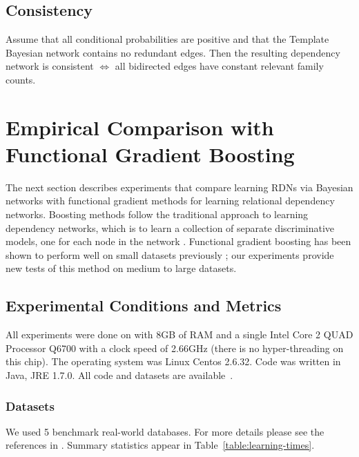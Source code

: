 \documentclass[runningheads,a4paper]{llncs}
\begin{document}
\subsection{Consistency}

\begin{theorem}
Assume that all conditional probabilities are positive and that the Template Bayesian network contains no redundant edges. Then the resulting dependency network is consistent $\iff$ all bidirected edges have constant relevant family counts.
\end{theorem}

\section{Empirical Comparison with Functional Gradient Boosting}\label{sec:empirical-comparison}

The next section describes experiments that compare learning RDNs via Bayesian networks with functional gradient methods for learning relational dependency networks. Boosting methods follow the traditional approach to learning dependency networks, which is to learn a collection of separate discriminative models, one for each node in the network \cite{Heckerman2000}. Functional gradient boosting has been shown to perform well on small datasets previously \cite{Khot2011,Natarajan2012}; our experiments provide new tests of this method on medium to large datasets. 
\subsection{Experimental Conditions and Metrics}\label{sec:conditions}
All experiments were done on with 8GB of RAM and a single Intel Core 2 QUAD Processor Q6700 with a clock speed of 2.66GHz (there is no hyper-threading on this chip). The operating system was Linux Centos 2.6.32. Code was written in Java, JRE 1.7.0. All code and datasets are available~\cite{bib:jbnsite}. 
\subsubsection{Datasets}
We used 5 benchmark real-world databases. For more details please see the references in \cite{Schulte2012}. Summary statistics appear in Table~\ref{table:learning-times}.
\end{document}
